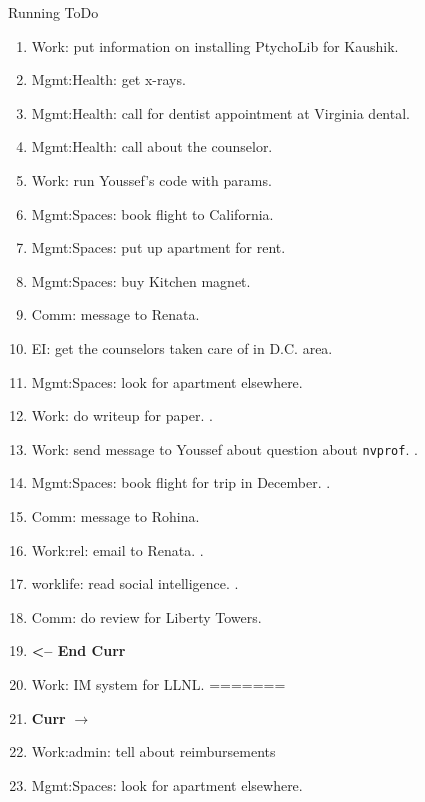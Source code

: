 \begin{columns}
\begin{column}{0.6\linewidth}
\begin{block}{Running ToDo}
\begin{enumerate}

     \item \tiny Work: put information on installing PtychoLib for Kaushik. 
     \item \tiny Mgmt:Health: get x-rays. 
     \item \tiny Mgmt:Health: call for dentist appointment at Virginia
       dental.
     \item \tiny Mgmt:Health: call about the counselor. 
     \item \tiny Work: run Youssef’s code with params.
     \item \tiny Mgmt:Spaces: book flight to California.
     \item \tiny Mgmt:Spaces: put up apartment for rent.
     \item \tiny Mgmt:Spaces: buy Kitchen magnet.
     \item \tiny Comm: message to Renata.
     \item \tiny EI: get the counselors taken care of in D.C. area. 
     \item \tiny Mgmt:Spaces: look for apartment elsewhere. 
     \item \tiny Work: do writeup for paper. . 
     \item \tiny Work: send message to Youssef about question about
       \texttt{nvprof}. .
     \item \tiny Mgmt:Spaces: book flight for trip in December. .
     \item \tiny Comm: message to Rohina. 
     \item \tiny Work:rel: email to Renata. . 
     \item \tiny worklife: read social intelligence. . 
     \item \tiny Comm: do review for Liberty Towers.
     \item \tiny \textbf{ <-- End Curr } 

     \item \tiny Work: IM system for LLNL.
=======



        \tiny \item \tiny \textbf{Curr} $\rightarrow$ 
        \item \tiny Work:admin: tell about reimbursements 
        \item \tiny  Mgmt:Spaces: look for apartment elsewhere. 


\end{enumerate}
\end{block}
\end{column}
\end{columns}
